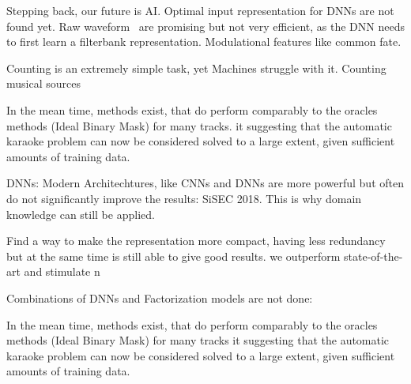 Stepping back, our future is AI.
Optimal input representation for DNNs are not found yet. Raw waveform~\cite{Dieleman14, wavenet?} are promising but not very efficient, as the DNN needs to first learn a filterbank representation. Modulational features like common fate.

Counting is an extremely simple task, yet Machines struggle with it. 
Counting musical sources

  In the mean time\cite{stoeter18},  methods exist, that do perform comparably to the oracles methods (Ideal Binary Mask) for many tracks.
 it suggesting that the automatic karaoke problem can now be considered
solved to a large extent, given sufficient amounts of training data.


\item DNNs: Modern Architechtures, like CNNs and DNNs are more powerful but often do not significantly improve the results: SiSEC 2018. This is why domain knowledge can still be applied.

Find a way to make the representation more compact, having less redundancy but at the same time is still able to give good results.
we outperform state-of-the-art and stimulate n

\item Combinations of DNNs and Factorization models are not done: ~\cite{vu16, leroux15}


In the mean time\cite{stoeter18}, methods exist, that do perform comparably to the oracles methods (Ideal Binary Mask) for many tracks it suggesting that the automatic karaoke problem can now be considered
solved to a large extent, given sufficient amounts of training data.